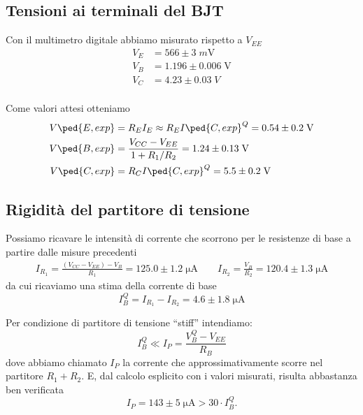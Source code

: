 \documentclass[10pt,a4paper]{article}
\begin{document}
\subsection{Tensioni ai terminali del BJT}
Con il multimetro digitale abbiamo misurato rispetto a $V_{EE}$
\begin{align*}
V_E &= 566 \pm 3 \; \si{m\V} \\
V_B &= 1.196 \pm 0.006 \; \si{\V} \\
V_C &= 4.23 \pm 0.03 \; \si{V} \\
\end{align*}

Come valori attesi otteniamo
\begin{align*}
V\ped{E, exp} &= R_E I_E \approx R_E I\ped{C, exp}^Q = 0.54 \pm 0.2 \; \si{\V} \\
V\ped{B, exp} &= \frac{V_{CC} - V_{EE}}{1 + R_1/R_2} = 1.24 \pm 0.13 \; \si{\V}
\\
V\ped{C, exp} &= R_C I\ped{C, exp}^Q = 5.5 \pm 0.2 \; \si{V} \\
\end{align*}
\subsection{Rigidità del partitore di tensione}
Possiamo ricavare le intensità di corrente che scorrono per le resistenze
di base a partire dalle misure precedenti
\begin{align*}
I_{R_1} = \frac{(V_{CC} - V_{EE}) - V_B}{R_1} = 125.0 \pm 1.2 \; \si{\micro\A} \qquad
I_{R_2} = \frac{V_B}{R_2} = 120.4 \pm 1.3 \; \si{\micro\A} 
\end{align*}
da cui ricaviamo una stima della corrente di base
\[
I_B^Q = I_{R_1} - I_{R_2} =  4.6 \pm 1.8 \; \si{\micro\A}
\]

Per condizione di partitore di tensione ``stiff'' intendiamo:
\begin{equation}
I_B^Q \ll I_P = \frac{V_B^Q - V_{EE}}{R_B}
\end{equation}
dove abbiamo chiamato $I_P$ la corrente che approssimativamente scorre nel
partitore $R_1 + R_2$.
E, dal calcolo esplicito con i valori misurati, risulta abbastanza ben
verificata
\[
I_P = 143 \pm 5 \; \si{\micro\A} > 30 \cdot I_B^Q
.\] 
\end{document}
